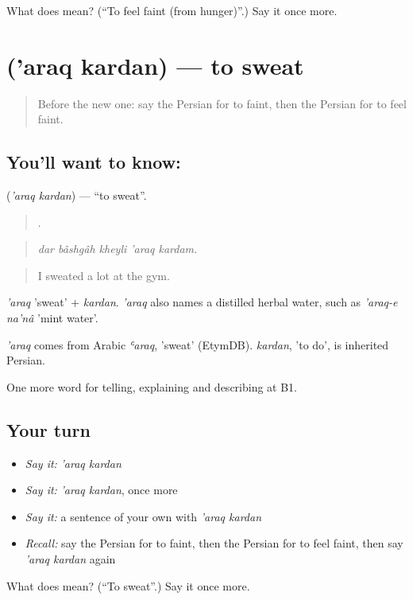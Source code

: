 \begin{tcolorbox}[breakable,colback=teal!4,colframe=teal!35!black,title={Before you move on}]
What does   mean? (\textquotedblleft{}To feel faint (from hunger)\textquotedblright{}.) Say it once more.
\end{tcolorbox}
\section[\texorpdfstring{\fa{عرق} \fa{کردن} ('araq kardan)}{عرق کردن ('araq kardan)}]{  ('araq kardan) — to sweat}

\label{lesson:FA-C492-araq-kardan}



\begin{quote}
Before the new one: say the Persian for to faint, then the Persian for to feel faint.
\end{quote}

\subsection*{You'll want to know:  }
\textbf{ } (\emph{'araq kardan}) — \textquotedblleft{}to sweat\textquotedblright{}.

\begin{quote}
    .
\end{quote}

\begin{quote}
\emph{dar bâshgâh kheyli 'araq kardam.}
\end{quote}

\begin{quote}
I sweated a lot at the gym.
\end{quote}

\emph{'araq} 'sweat' + \emph{kardan}. \emph{'araq} also names a distilled herbal water, such as \emph{'araq-e na'nâ} 'mint water'.

\begin{cousinweb}
\emph{'araq} comes from Arabic \emph{ʿaraq}, 'sweat' (EtymDB). \emph{kardan}, 'to do', is inherited Persian.
\end{cousinweb}

\begin{grammarlens}[title={What you've built}]
One more word for telling, explaining and describing at B1.
\end{grammarlens}

\subsection*{Your turn}
\begin{itemize}
\raggedright
  \item \emph{Say it:} \emph{'araq kardan}
  \item \emph{Say it:} \emph{'araq kardan}, once more
  \item \emph{Say it:} a sentence of your own with \emph{'araq kardan}
  \item \emph{Recall:} say the Persian for to faint, then the Persian for to feel faint, then say \emph{'araq kardan} again
\end{itemize}

\begin{tcolorbox}[breakable,colback=teal!4,colframe=teal!35!black,title={Before you move on}]
What does   mean? (\textquotedblleft{}To sweat\textquotedblright{}.) Say it once more.
\end{tcolorbox}

